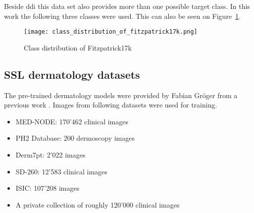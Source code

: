 Beside \gls{ddi} this data set also provides more than one possible target class. In this work the following three classes were used. This can also be seen on Figure~\ref{fig:class_distribution_of_fitzpatrick17k}.

\begin{figure}[H]
    \begin{center}
    \texttt{[image: class\_distribution\_of\_fitzpatrick17k.png]}
    \caption{Class distribution of Fitzpatrick17k}\label{fig:class_distribution_of_fitzpatrick17k}
    \end{center}
\end{figure}

\subsection{SSL dermatology datasets}
The pre-trained dermatology models were provided by Fabian Gröger from a previous work \autocite{groeger2023}. Images from following datasets were used for training.


\begin{itemize}
    \item MED-NODE: 170'462 clinical images \autocite{giotis2015}
    \item PH2 Database: 200 dermoscopy images \autocite{mendonca2013}
    \item Derm7pt: 2'022 images \autocite{kawahara2019}
    \item SD-260: 12'583 clinical images \autocite{sun2016}
    \item ISIC: 107'208 images \autocite{giotis2015}
    \item A private collection of roughly 120'000 clinical images 
\end{itemize}
